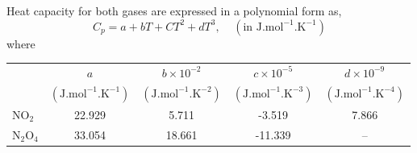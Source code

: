 \documentclass[calculator,allquestions,datasheet,Pens]{exam_newMarcus2}
\begin{document}
\begin{question}
\begin{enumerate}[a)]
{             }
  
          
     \end{enumerate}
     Heat capacity for both gases are expressed in a polynomial form as,
  \begin{displaymath}
    C_{p} = a + bT + CT^{2} + dT^{3}, \;\;\;\;\left(\text{in J.mol}^{-1}\text{.K}^{-1}\right)
  \end{displaymath}
  where
  \begin{center}
    \begin{tabular}{ l | c c c c }
      \hline
                         &  $a$     &  $b\times 10^{-2}$  & $c\times 10^{-5}$  & $d\times 10^{-9}$ \\
                         &$\left(\text{J.mol}^{-1}\text{.K}^{-1}\right)$& $\left(\text{J.mol}^{-1}\text{.K}^{-2}\right)$& $\left(\text{J.mol}^{-1}\text{.K}^{-3}\right)$& $\left(\text{J.mol}^{-1}\text{.K}^{-4}\right)$ \\
      \hline
      NO$_{2}$             &  22.929 &      5.711          & -3.519            & 7.866 \\
      N$_{2}$O$_{4}$       &   33.054 &      18.661         &    -11.339        &  -- 
    \end{tabular}
  \end{center}
\end{question}

\clearpage
\end{document}
